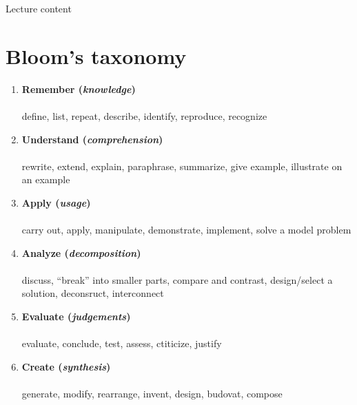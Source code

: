 Lecture content\\

\newpage

\chapter*{Bloom's taxonomy}
\label{bloom}
\vspace{-0.5em}
\vspace{-0.3em}

\begin{enumerate}[leftmargin=*]
\item \textbf{Remember (\textit{knowledge})}\\
\\
{\small define, list, repeat, describe, identify, reproduce, recognize}

\item \textbf{Understand (\textit{comprehension})}\\
\\
{\small rewrite, extend, explain, paraphrase, summarize, give example, illustrate on an example}

\item \textbf{Apply (\textit{usage})}\\
\\
{\small carry out, apply, manipulate, demonstrate, implement, solve a model problem}

\item \textbf{Analyze (\textit{decomposition})}\\
\\
{\small discuss, \enquote{break} into smaller parts, compare and contrast, design/select a solution, deconsruct, interconnect}

\item \textbf{Evaluate (\textit{judgements})}\\
\\
{\small evaluate, conclude, test, assess, ctiticize, justify}

\item \textbf{Create (\textit{synthesis})}\\
\\
{\small generate, modify, rearrange, invent, design, budovat, compose}
\end{enumerate}


